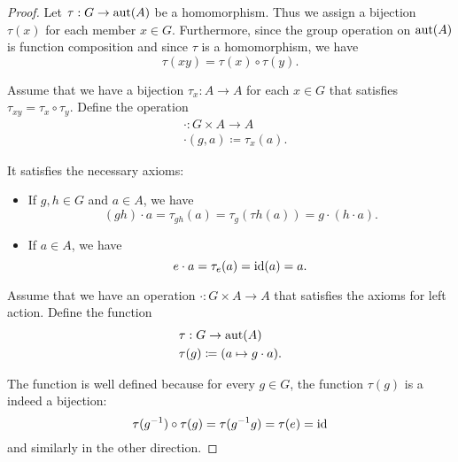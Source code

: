 \begin{proof}
   Let \( \tau: G \to \operatorname{aut}(A) \) be a homomorphism. Thus we assign a bijection \( \tau(x) \) for each member \( x \in G \). Furthermore, since the group operation on \( \operatorname{aut}(A) \) is function composition and since \( \tau \) is a homomorphism, we have
  \begin{equation*}
    \tau(xy) = \tau(x) \circ \tau(y).
  \end{equation*}

   Assume that we have a bijection \( \tau_x: A \to A \) for each \( x \in G \) that satisfies \( \tau_{xy} = \tau_x \circ \tau_y \). Define the operation
  \begin{align*}
     & \cdot: G \times A \to A          \\
     & \cdot(g, a) \coloneqq \tau_x(a).
  \end{align*}

  It satisfies the necessary axioms:
  \begin{itemize}
    \item If \( g, h \in G \) and \( a \in A \), we have
          \begin{equation*}
            (g h) \cdot a
            =
            \tau_{g h}(a)
            =
            \tau_{g}(\tau{h}(a))
            =
            g \cdot (h \cdot a).
          \end{equation*}

    \item If \( a \in A \), we have
          \begin{equation*}
            e \cdot a
            =
            \tau_e(a)
            =
            \operatorname{id}(a)
            =
            a.
          \end{equation*}
  \end{itemize}

   Assume that we have an operation \( \cdot: G \times A \to A \) that satisfies the axioms for left action. Define the function
  \begin{align*}
     & \tau: G \to \operatorname{aut}(A)                      \\
     & \tau(g) \coloneqq (a \mapsto g \cdot a).
  \end{align*}

  The function is well defined because for every \( g \in G \), the function \( \tau(g) \) is a indeed a bijection:
  \begin{equation*}
    \tau(g^{-1}) \circ \tau(g)
    =
    \tau(g^{-1} g)
    =
    \tau(e)
    =
    \operatorname{id}
  \end{equation*}
  and similarly in the other direction.


\end{proof}
